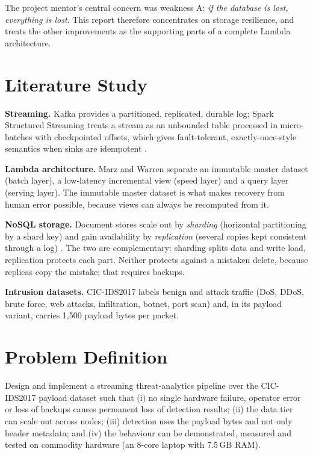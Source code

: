 The project mentor's central concern was weakness A: \emph{if the database is lost, everything is lost}. This report therefore concentrates on storage resilience, and treats the other improvements as the supporting parts of a complete Lambda architecture.

\section{Literature Study}
\justify
\textbf{Streaming.} Kafka \cite{kafka} provides a partitioned, replicated, durable log; Spark Structured Streaming \cite{structuredstreaming} treats a stream as an unbounded table processed in micro-batches with checkpointed offsets, which gives fault-tolerant, exactly-once-style semantics when sinks are idempotent \cite{maas}.

\textbf{Lambda architecture.} Marz and Warren \cite{lambda} separate an immutable master dataset (batch layer), a low-latency incremental view (speed layer) and a query layer (serving layer). The immutable master dataset is what makes recovery from human error possible, because views can always be recomputed from it.

\textbf{NoSQL storage.} Document stores scale out by \emph{sharding} (horizontal partitioning by a shard key) and gain availability by \emph{replication} (several copies kept consistent through a log) \cite{mongodb,erl}. The two are complementary: sharding splits data and write load, replication protects each part. Neither protects against a mistaken delete, because replicas copy the mistake; that requires backups.

\textbf{Intrusion datasets.} CIC-IDS2017 \cite{cicids} labels benign and attack traffic (DoS, DDoS, brute force, web attacks, infiltration, botnet, port scan) and, in its payload variant, carries 1,500 payload bytes per packet.

\section{Problem Definition}
\justify
Design and implement a streaming threat-analytics pipeline over the CIC-IDS2017 payload dataset such that (i) no single hardware failure, operator error or loss of backups causes permanent loss of detection results; (ii) the data tier can scale out across nodes; (iii) detection uses the payload bytes and not only header metadata; and (iv) the behaviour can be demonstrated, measured and tested on commodity hardware (an 8-core laptop with 7.5\,GB RAM).

